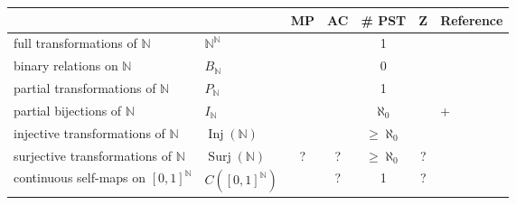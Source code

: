 \documentclass[11pt]{amsart}
\newcommand{\cmark}{\ding{51}}%
\newcommand{\xmark}{\ding{55}}%
\theoremstyle{definition}
\newcommand{\N}{\mathbb N}
\newcommand{\Inj}{\operatorname{Inj}}
\newcommand{\Surj}{\operatorname{Surj}}
\begin{document}
\begin{figure}
    \centering

\begin{tabular}{ll|c|c|c|c|l}
                                &                                     &MP & AC
                                          & \# PST                               &  Z                        &Reference                                                                                          \\ \hline
    full transformations of $\N$                 & $\N ^ \N$                          & \cmark  & \cmark
                                          & 1                                    & \cmark 
                                                                       &
    \cite{main}
    \\
    binary relations on $\N$                     & $B_{\N}$                             & \xmark& \cmark
                                          & 0                                     & \cmark        &
    \cite{main}
    \\
    partial transformations of $\N$               & $P_{\N}$                            & \cmark & \cmark
                                          & 1                                     & \cmark                            &
    \cite{main}
    \\
    partial bijections of $\N$                   & $I_{\N}$                            & \cmark & \cmark
                                          & $\aleph_0$                               & \cmark     
                                                                              &
    \cite{main}+\cite{BEMP}
    \\
    injective transformations of $\N$            & $\Inj(\N)$                         & \cmark  & \cmark
                                          & $\geq\aleph_0$                             & \cmark 
                                                                              &
    \cite{main}
    \\
    surjective transformations of $\N$           & $\Surj(\N)$   &?                       & ?
                                          & $\geq\aleph_0$                             & ?      
                                                                              &
    \cite{main}
    \\
    continuous self-maps on $[0, 1] ^ \N$ & $C([0, 1] ^ \N)$ & \cmark                    & ?
                                          & 1                                          & ?                & \cite{main}                                   \\

\end{tabular}
\end{figure}
\end{document}
